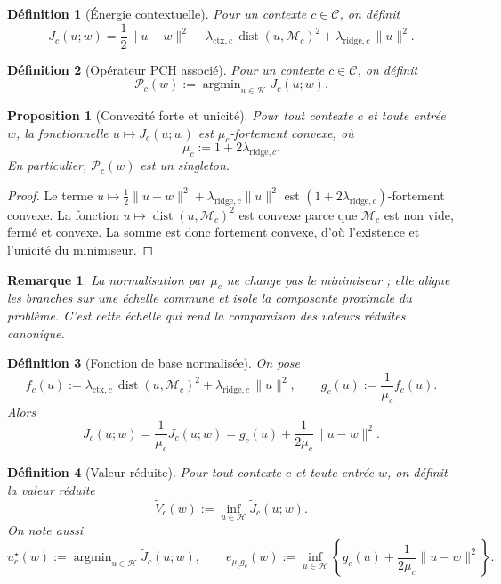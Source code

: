 \documentclass[11pt,a4paper]{article}
\newtheorem{definition}{Définition}[section]
\newtheorem{proposition}{Proposition}[section]
\newtheorem{remark}{Remarque}[section]
\DeclareMathOperator{\argmin}{argmin}
\DeclareMathOperator{\dist}{dist}
\newcommand{\Hh}{\mathcal H}
\newcommand{\Mcal}{\mathcal M}
\newcommand{\Ccal}{\mathcal C}
\newcommand{\Pcal}{\mathcal P}
\begin{document}
\begin{definition}[Énergie contextuelle]
Pour un contexte \(c\in\Ccal\), on définit
\[
J_c(u;w)=\frac12\|u-w\|^2+\lambda_{\mathrm{ctx},c}\,\dist(u,\Mcal_c)^2+\lambda_{\mathrm{ridge},c}\,\|u\|^2.
\]
\end{definition}

\begin{definition}[Opérateur PCH associé]
Pour un contexte \(c\in\Ccal\), on définit
\[
\Pcal_c(w):=\argmin_{u\in\Hh}J_c(u;w).
\]
\end{definition}

\begin{proposition}[Convexité forte et unicité]
Pour tout contexte \(c\) et toute entrée \(w\), la fonctionnelle \(u\mapsto J_c(u;w)\) est \(\mu_c\)-fortement convexe, où
\[
\mu_c:=1+2\lambda_{\mathrm{ridge},c}.
\]
En particulier, \(\Pcal_c(w)\) est un singleton.
\end{proposition}

\begin{proof}
Le terme \(u\mapsto \frac12\|u-w\|^2+\lambda_{\mathrm{ridge},c}\|u\|^2\) est \((1+2\lambda_{\mathrm{ridge},c})\)-fortement convexe. La fonction \(u\mapsto \dist(u,\Mcal_c)^2\) est convexe parce que \(\Mcal_c\) est non vide, fermé et convexe. La somme est donc fortement convexe, d'où l'existence et l'unicité du minimiseur.
\end{proof}

\begin{remark}
La normalisation par \(\mu_c\) ne change pas le minimiseur ; elle aligne les branches sur une échelle commune et isole la composante proximale du problème. C'est cette échelle qui rend la comparaison des valeurs réduites canonique.
\end{remark}

\begin{definition}[Fonction de base normalisée]
On pose
\[
f_c(u):=\lambda_{\mathrm{ctx},c}\,\dist(u,\Mcal_c)^2+\lambda_{\mathrm{ridge},c}\,\|u\|^2,
\qquad
g_c(u):=\frac{1}{\mu_c}f_c(u).
\]
Alors
\[
\widetilde J_c(u;w)=\frac{1}{\mu_c}J_c(u;w)=g_c(u)+\frac{1}{2\mu_c}\|u-w\|^2.
\]
\end{definition}

\begin{definition}[Valeur réduite]
Pour tout contexte \(c\) et toute entrée \(w\), on définit la valeur réduite
\[
\widetilde V_c(w):=\inf_{u\in\Hh}\widetilde J_c(u;w).
\]
On note aussi
\[
 u_c^\star(w):=\argmin_{u\in\Hh}\widetilde J_c(u;w),
\qquad
 e_{\mu_c g_c}(w):=\inf_{u\in\Hh}\left\{g_c(u)+\frac{1}{2\mu_c}\|u-w\|^2\right\}.
\]
\end{definition}
\end{document}
